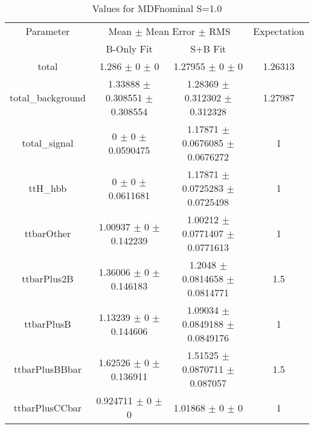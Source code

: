 \begin{table}
\centering
\caption{Values for MDFnominal S=1.0}
\begin{tabular}{cccc}
\toprule
Parameter & \multicolumn{2}{c}{Mean $\pm$ Mean Error $\pm$ RMS} & Expectation\\
 & B-Only Fit & S+B Fit & \\
\midrule
total & \num{1.286} $\pm$ \num{0} $\pm$ \num{0} & \num{1.27955} $\pm$ \num{0} $\pm$ \num{0} & \num{1.26313}\\
total\_background & \num{1.33888} $\pm$ \num{0.308551} $\pm$ \num{0.308554} & \num{1.28369} $\pm$ \num{0.312302} $\pm$ \num{0.312328} & \num{1.27987}\\
total\_signal & \num{0} $\pm$ \num{0} $\pm$ \num{0.0590475} & \num{1.17871} $\pm$ \num{0.0676085} $\pm$ \num{0.0676272} & \num{1}\\
ttH\_hbb & \num{0} $\pm$ \num{0} $\pm$ \num{0.0611681} & \num{1.17871} $\pm$ \num{0.0725283} $\pm$ \num{0.0725498} & \num{1}\\
ttbarOther & \num{1.00937} $\pm$ \num{0} $\pm$ \num{0.142239} & \num{1.00212} $\pm$ \num{0.0771407} $\pm$ \num{0.0771613} & \num{1}\\
ttbarPlus2B & \num{1.36006} $\pm$ \num{0} $\pm$ \num{0.146183} & \num{1.2048} $\pm$ \num{0.0814658} $\pm$ \num{0.0814771} & \num{1.5}\\
ttbarPlusB & \num{1.13239} $\pm$ \num{0} $\pm$ \num{0.144606} & \num{1.09034} $\pm$ \num{0.0849188} $\pm$ \num{0.0849176} & \num{1}\\
ttbarPlusBBbar & \num{1.62526} $\pm$ \num{0} $\pm$ \num{0.136911} & \num{1.51525} $\pm$ \num{0.0870711} $\pm$ \num{0.087057} & \num{1.5}\\
ttbarPlusCCbar & \num{0.924711} $\pm$ \num{0} $\pm$ \num{0} & \num{1.01868} $\pm$ \num{0} $\pm$ \num{0} & \num{1}\\
\bottomrule
\end{tabular}
\end{table}